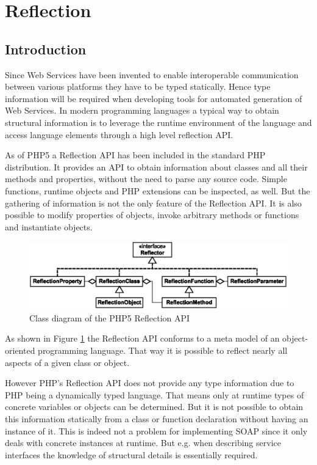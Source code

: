 \documentclass[10pt,final,a4paper,oneside]{article}
\begin{document}
\section{Reflection}\label{sec:Reflection}
%
\subsection{Introduction}
Since Web Services have been invented
to enable interoperable communication between
various platforms they have to be typed statically.
Hence type information will be required when
developing tools for automated generation of Web Services.
In modern programming languages
a typical way to obtain structural information
is to leverage the runtime environment of the language
and access language elements through a high level reflection API.

As of PHP5 a Reflection API has been included
in the standard PHP distribution.
It provides an API to obtain information about classes
and all their methods and properties,
without the need to parse any source code.
Simple functions, runtime objects and PHP extensions
can be inspected, as well.
But the gathering of information is not the
only feature of the Reflection API.
It is also possible to modify properties of objects,
invoke arbitrary methods or functions and
instantiate objects.

\begin{figure}[htbp]
	\centering
		\includegraphics[width=1.00\textwidth]{figures/php5-reflection-api.eps}
	\caption{Class diagram of the  PHP5 Reflection API}
	\label{fig:php5-reflection-api}
\end{figure}

As shown in Figure \ref{fig:php5-reflection-api}
the Reflection API conforms to a meta model
of an object-oriented programming language.
That way it is possible to reflect
nearly all aspects of a given class or object.

However PHP's Reflection API does not provide any type information
due to PHP being a dynamically typed language.
That means only at runtime types of concrete variables or objects
can be determined.
But it is not possible to obtain this information statically from
a class or function declaration without having an instance of it.
This is indeed not a problem for implementing SOAP
since it only deals with concrete instances at runtime.
But e.g. when describing service interfaces
the knowledge of structural details is essentially required.
\end{document}
